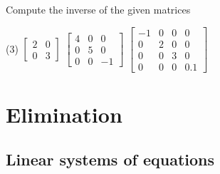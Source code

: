 \begin{exercise}
Compute the inverse of the given matrices
\begin{tasks}(3)
\task
$\begin{bmatrix}
2 & 0 \\
0 & 3 
\end{bmatrix}$
\task
$\begin{bmatrix}
4 & 0 & 0 \\
0 & 5 & 0 \\ 
0 & 0 & -1
\end{bmatrix}$
\task
$\begin{bmatrix}
-1 & 0 & 0 & 0 \\
0 & 2 & 0 & 0 \\ 
0 & 0 & 3 & 0 \\
0 & 0 & 0 & 0.1
\end{bmatrix}$
\end{tasks}
\end{exercise}




\sectionnewpage
\section{Elimination}
\label{elim:section}



\subsection{Linear systems of equations}

